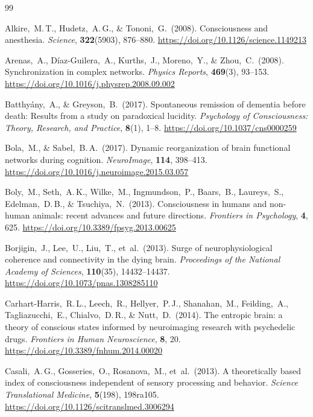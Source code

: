 \documentclass[11pt,a4paper]{article}
\theoremstyle{plain}
\theoremstyle{definition}
\theoremstyle{remark}
\begin{document}
\newpage
\begin{thebibliography}{99}

Alkire,~M.\,T., Hudetz,~A.\,G., \& Tononi,~G.\ (2008).
Consciousness and anesthesia.
\textit{Science}, \textbf{322}(5903), 876--880.
\url{https://doi.org/10.1126/science.1149213}

Arenas,~A., D{\'i}az-Guilera,~A., Kurths,~J., Moreno,~Y., \& Zhou,~C.\ (2008).
Synchronization in complex networks.
\textit{Physics Reports}, \textbf{469}(3), 93--153.
\url{https://doi.org/10.1016/j.physrep.2008.09.002}

Batthy{\'a}ny,~A., \& Greyson,~B.\ (2017).
Spontaneous remission of dementia before death: Results from a study on paradoxical lucidity.
\textit{Psychology of Consciousness: Theory, Research, and Practice}, \textbf{8}(1), 1--8.
\url{https://doi.org/10.1037/cns0000259}

Bola,~M., \& Sabel,~B.\,A.\ (2017).
Dynamic reorganization of brain functional networks during cognition.
\textit{NeuroImage}, \textbf{114}, 398--413.
\url{https://doi.org/10.1016/j.neuroimage.2015.03.057}

Boly,~M., Seth,~A.\,K., Wilke,~M., Ingmundson,~P., Baars,~B., Laureys,~S., Edelman,~D.\,B., \& Tsuchiya,~N.\ (2013).
Consciousness in humans and non-human animals: recent advances and future directions.
\textit{Frontiers in Psychology}, \textbf{4}, 625.
\url{https://doi.org/10.3389/fpsyg.2013.00625}

Borjigin,~J., Lee,~U., Liu,~T., et~al.\ (2013).
Surge of neurophysiological coherence and connectivity in the dying brain.
\textit{Proceedings of the National Academy of Sciences}, \textbf{110}(35), 14432--14437.
\url{https://doi.org/10.1073/pnas.1308285110}

Carhart-Harris,~R.\,L., Leech,~R., Hellyer,~P.\,J., Shanahan,~M., Feilding,~A., Tagliazucchi,~E., Chialvo,~D.\,R., \& Nutt,~D.\ (2014).
The entropic brain: a theory of conscious states informed by neuroimaging research with psychedelic drugs.
\textit{Frontiers in Human Neuroscience}, \textbf{8}, 20.
\url{https://doi.org/10.3389/fnhum.2014.00020}

Casali,~A.\,G., Gosseries,~O., Rosanova,~M., et~al.\ (2013).
A theoretically based index of consciousness independent of sensory processing and behavior.
\textit{Science Translational Medicine}, \textbf{5}(198), 198ra105.
\url{https://doi.org/10.1126/scitranslmed.3006294}


\end{thebibliography}
\end{document}
